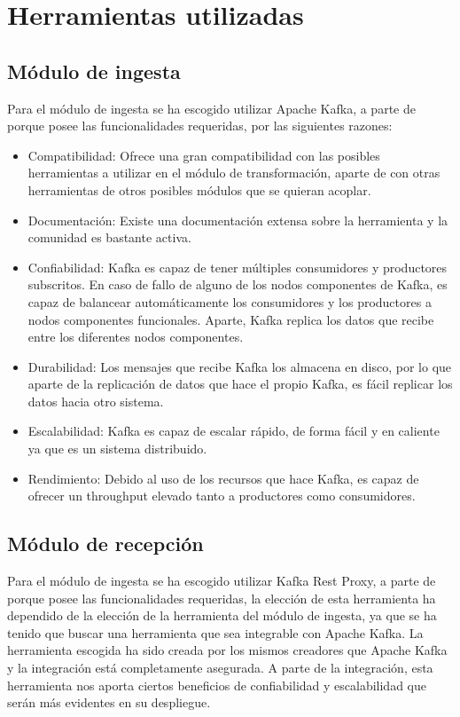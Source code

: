 \section{Herramientas utilizadas}

\subsection{Módulo de ingesta}
Para el módulo de ingesta se ha escogido utilizar Apache Kafka\cite{Tfg:kafka}, a parte de porque posee las funcionalidades requeridas, por las siguientes razones:

\begin{itemize}
	\item Compatibilidad: Ofrece una gran compatibilidad con las posibles herramientas a utilizar en el módulo de transformación, aparte de con otras herramientas de otros posibles módulos que se quieran acoplar.
	
	\item Documentación: Existe una documentación extensa sobre la herramienta y la comunidad es bastante activa.
	
	\item Confiabilidad: Kafka es capaz de tener múltiples consumidores y productores subscritos. En caso de fallo de alguno de los nodos componentes de Kafka, es capaz de balancear automáticamente los consumidores y los productores a nodos componentes funcionales. Aparte, Kafka replica los datos que recibe entre los diferentes nodos componentes.
	
	\item Durabilidad: Los mensajes que recibe Kafka los almacena en disco, por lo que aparte de la replicación de datos que hace el propio Kafka, es fácil replicar los datos hacia otro sistema.
	
	\item Escalabilidad: Kafka es capaz de escalar rápido, de forma fácil y en caliente ya que es un sistema distribuido.
	
	\item Rendimiento: Debido al uso de los recursos que hace Kafka, es capaz de ofrecer un throughput elevado tanto a productores como consumidores.
\end{itemize}

\subsection{Módulo de recepción}
Para el módulo de ingesta se ha escogido utilizar Kafka Rest Proxy\cite{Tfg:kafkarestproxy}, a parte de porque posee las funcionalidades requeridas, la elección de esta herramienta ha dependido de la elección de la herramienta del módulo de ingesta, ya que se ha tenido que buscar una herramienta que sea integrable con Apache Kafka. La herramienta escogida ha sido creada por los mismos creadores que Apache Kafka y la integración está completamente asegurada. A parte de la integración, esta herramienta nos aporta ciertos beneficios de confiabilidad y escalabilidad que serán más evidentes en su despliegue.

